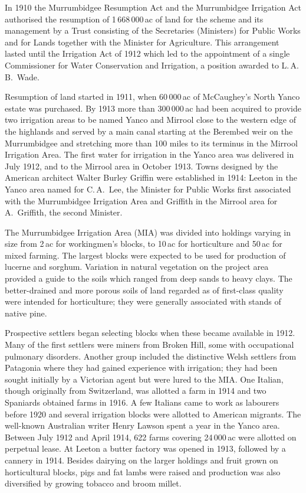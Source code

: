 In 1910 the Murrumbidgee Resumption Act and the Murrumbidgee
Irrigation Act authorised the resumption of 1\,668\,000\,ac of land
for the scheme and its management by a Trust consisting of the
Secretaries (Ministers) for Public Works and for Lands together with
the Minister for Agriculture. This arrangement lasted until the
Irrigation Act of 1912 which led to the appointment of a single
Commissioner for Water Conservation and Irrigation, a position awarded
to L.\,A.\,B.~Wade.

Resumption of land started in 1911, when 60\,000\,ac of McCaughey's
North Yanco estate was purchased.  By 1913 more than 300\,000\,ac had
been acquired to provide two irrigation areas to be named Yanco and
Mirrool close to the western edge of the highlands and served by a
main canal starting at the Berembed weir on the Murrumbidgee and
stretching more than 100 miles to its terminus in the Mirrool
Irrigation Area. The first water for irrigation in the Yanco area was
delivered in July 1912, and to the Mirrool area in October 1913.
Towns designed by the American architect Walter Burley Griffin were
established in 1914: Leeton in the Yanco area named for C.\,A.~Lee,
the Minister for Public Works first associated with the Murrumbidgee
Irrigation Area and Griffith in the Mirrool area for A.~Griffith, the
second Minister.

The Murrumbidgee Irrigation Area (MIA) was divided into holdings
varying in size from 2\,ac for workingmen's blocks, to 10\,ac for
horticulture and 50\,ac for mixed farming.  The largest blocks were
expected to be used for production of lucerne and sorghum.  Variation
in natural vegetation on the project area provided a guide to the
soils which ranged from deep sands to heavy clays.  The better-drained
and more porous soils of land regarded as of first-class quality were
intended for horticulture; they were generally associated with stands
of native pine.

Prospective settlers began selecting blocks when these became
available in 1912.  Many of the first settlers were miners from Broken
Hill, some with occupational pulmonary disorders.  Another group
included the distinctive Welsh settlers from Patagonia where they had
gained experience with irrigation; they had been sought initially by a
Victorian agent but were lured to the MIA.  One Italian, though
originally from Switzerland, was allotted a farm in 1914 and two
Spaniards obtained farms in 1916.  A few Italians came to work as
labourers before 1920 and several irrigation blocks were allotted to
American migrants.  The well-known Australian writer Henry Lawson
spent a year in the Yanco area.  Between July 1912 and April 1914, 622
farms covering 24\,000\,ac were allotted on perpetual lease.  At
Leeton a butter factory was opened in 1913, followed by a cannery in
1914.  Besides dairying on the larger holdings and fruit grown on
horticultural blocks, pigs and fat lambs were raised and production
was also diversified by growing tobacco and broom
millet.

